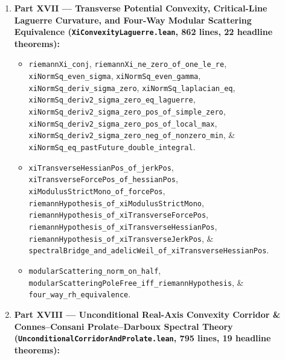 \documentclass[
  11pt,
]{article}
\providecommand{\tightlist}{%
  \setlength{\itemsep}{0pt}\setlength{\parskip}{0pt}}
\begin{document}
\begin{enumerate}
  \begin{itemize}
  \tightlist
  \item
    \texttt{trigRotor\_pos\_iff\_prime},
    \texttt{trigRotor\_eq\_zero\_iff\_not\_prime},
    \texttt{primeIndicator\_eq\_limit\_rotor},
    \texttt{vonMangoldt\_eq\_sum\_prime\_powers}, \&
    \texttt{finite\_eulerProduct\_ne\_zero}.
  \item
    \texttt{jacobiPsi\_functional\_duality},
    \texttt{thetaHalfDeriv\_zero}, \texttt{riemannPhi\_even},
    \texttt{riemannPhi\_pos\_of\_nonneg}, \& \texttt{riemannPhi\_pos}.
  \item
    \texttt{completedRiemannZeta₀\_eq\_past\_future\_integral},
    \texttt{completedRiemannZeta₀\_re\_im\_pastFuture},
    \texttt{riemannXi\_entire}, \texttt{riemannXi\_one\_sub},
    \texttt{riemannXi\_eq\_pastFuture\_phi\_integral},
    \texttt{riemannXi\_re\_im\_pastFuture\_phi},
    \texttt{riemannXi\_im\_half\_eq\_zero}, \&
    \texttt{riemannZeta\_zero\_iff\_pastFuture\_coupled\_integrals}.
  \item
    \texttt{polyaMoment\_pos}, \texttt{polyaMoment\_turan\_logconvex},
    \texttt{polyaMoment\_hankel\_psd}, \&
    \texttt{finite\_gram\_form\_nonneg}.
  \end{itemize}
\item
  \textbf{Part XVII --- Transverse Potential Convexity, Critical-Line
  Laguerre Curvature, and Four-Way Modular Scattering Equivalence
  (\texttt{XiConvexityLaguerre.lean}, 862 lines, 22 headline theorems):}

  \begin{itemize}
  \tightlist
  \item
    \texttt{riemannXi\_conj},
    \texttt{riemannXi\_ne\_zero\_of\_one\_le\_re},
    \texttt{xiNormSq\_even\_sigma}, \texttt{xiNormSq\_even\_gamma},
    \texttt{xiNormSq\_deriv\_sigma\_zero},
    \texttt{xiNormSq\_laplacian\_eq},
    \texttt{xiNormSq\_deriv2\_sigma\_zero\_eq\_laguerre},
    \texttt{xiNormSq\_deriv2\_sigma\_zero\_pos\_of\_simple\_zero},
    \texttt{xiNormSq\_deriv2\_sigma\_zero\_pos\_of\_local\_max},
    \texttt{xiNormSq\_deriv2\_sigma\_zero\_neg\_of\_nonzero\_min}, \&
    \texttt{xiNormSq\_eq\_pastFuture\_double\_integral}.
  \item
    \texttt{xiTransverseHessianPos\_of\_jerkPos},
    \texttt{xiTransverseForcePos\_of\_hessianPos},
    \texttt{xiModulusStrictMono\_of\_forcePos},
    \texttt{riemannHypothesis\_of\_xiModulusStrictMono},
    \texttt{riemannHypothesis\_of\_xiTransverseForcePos},
    \texttt{riemannHypothesis\_of\_xiTransverseHessianPos},
    \texttt{riemannHypothesis\_of\_xiTransverseJerkPos}, \&
    \texttt{spectralBridge\_and\_adelicWeil\_of\_xiTransverseHessianPos}.
  \item
    \texttt{modularScattering\_norm\_on\_half},
    \texttt{modularScatteringPoleFree\_iff\_riemannHypothesis}, \&
    \texttt{four\_way\_rh\_equivalence}.
  \end{itemize}
\item
  \textbf{Part XVIII --- Unconditional Real-Axis Convexity Corridor \&
  Connes--Consani Prolate--Darboux Spectral Theory
  (\texttt{UnconditionalCorridorAndProlate.lean}, 795 lines, 19 headline
  theorems):}


\end{enumerate}
\end{document}
